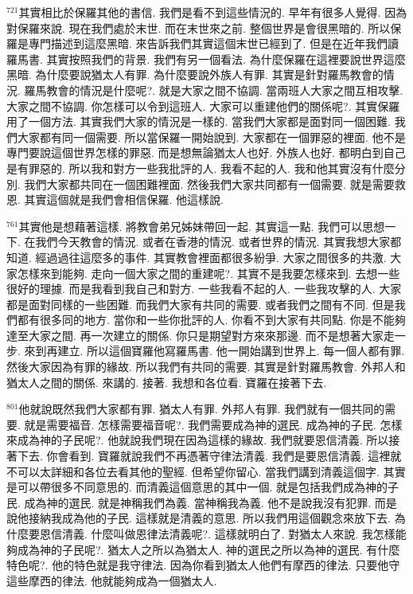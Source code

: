 \documentclass{book}
\begin{document}
$^{721}$其實相比於保羅其他的書信.
我們是看不到這些情況的.
早年有很多人覺得.
因為對保羅來說.
現在我們處於末世.
而在末世來之前.
整個世界是會很黑暗的.
所以保羅是專門描述到這麼黑暗.
來告訴我們其實這個末世已經到了.
但是在近年我們讀羅馬書.
其實按照我們的背景.
我們有另一個看法.
為什麼保羅在這裡要說世界這麼黑暗.
為什麼要說猶太人有罪.
為什麼要說外族人有罪.
其實是針對羅馬教會的情況.
羅馬教會的情況是什麼呢?.
就是大家之間不協調.
當兩班人大家之間互相攻擊.
大家之間不協調.
你怎樣可以令到這班人.
大家可以重建他們的關係呢?.
其實保羅用了一個方法.
其實我們大家的情況是一樣的.
當我們大家都是面對同一個困難.
我們大家都有同一個需要.
所以當保羅一開始說到.
大家都在一個罪惡的裡面.
他不是專門要說這個世界怎樣的罪惡.
而是想無論猶太人也好.
外族人也好.
都明白到自己是有罪惡的.
所以我和對方一些我批評的人.
我看不起的人.
我和他其實沒有什麼分別.
我們大家都共同在一個困難裡面.
然後我們大家共同都有一個需要.
就是需要救恩.
其實這個就是我們會相信保羅.
他這樣說.

$^{761}$其實他是想藉著這樣.
將教會弟兄姊妹帶回一起.
其實這一點.
我們可以思想一下.
在我們今天教會的情況.
或者在香港的情況.
或者世界的情況.
其實我想大家都知道.
經過過往這麼多的事件.
其實教會裡面都很多紛爭.
大家之間很多的共激.
大家怎樣來到能夠.
走向一個大家之間的重建呢?.
其實不是我要怎樣來到.
去想一些很好的理據.
而是我看到我自己和對方.
一些我看不起的人.
一些我攻擊的人.
大家都是面對同樣的一些困難.
而我們大家有共同的需要.
或者我們之間有不同.
但是我們都有很多同的地方.
當你和一些你批評的人.
你看不到大家有共同點.
你是不能夠達至大家之間.
再一次建立的關係.
你只是期望對方來來那邊.
而不是想著大家走一步.
來到再建立.
所以這個寶羅他寫羅馬書.
他一開始講到世界上.
每一個人都有罪.
然後大家因為有罪的緣故.
所以我們有共同的需要.
其實是針對羅馬教會.
外邦人和猶太人之間的關係.
來講的.
接著.
我想和各位看.
寶羅在接著下去.

$^{801}$他就說既然我們大家都有罪.
猶太人有罪.
外邦人有罪.
我們就有一個共同的需要.
就是需要福音.
怎樣需要福音呢?.
我們需要成為神的選民.
成為神的子民.
怎樣來成為神的子民呢?.
他就說我們現在因為這樣的緣故.
我們就要恩信清義.
所以接著下去.
你會看到.
寶羅就說我們不再憑著守律法清義.
我們是要恩信清義.
這裡就不可以太詳細和各位去看其他的聖經.
但希望你留心.
當我們講到清義這個字.
其實是可以帶很多不同意思的.
而清義這個意思的其中一個.
就是包括我們成為神的子民.
成為神的選民.
就是神稱我們為義.
當神稱我為義.
他不是說我沒有犯罪.
而是說他接納我成為他的子民.
這樣就是清義的意思.
所以我們用這個觀念來放下去.
為什麼要恩信清義.
什麼叫做恩律法清義呢?.
這樣就明白了.
對猶太人來說.
我怎樣能夠成為神的子民呢?.
猶太人之所以為猶太人.
神的選民之所以為神的選民.
有什麼特色呢?.
他的特色就是我守律法.
因為你看到猶太人他們有摩西的律法.
只要他守這些摩西的律法.
他就能夠成為一個猶太人.
\end{document}
